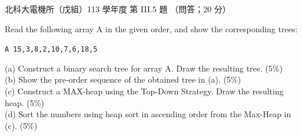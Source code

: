 \begin{pastexam}[label={px:ntut-113-ee-ds-14}]{北科大電機所（戊組）113 學年度 第 III.5 題}
（問答；20 分）

Read the following array A in the given order, and show the corresponding trees:
\begin{center}\texttt{A 15,3,8,2,10,7,6,18,5}\end{center}
(a) Construct a binary search tree for array A. Draw the resulting tree. (5\%)\\
(b) Show the pre-order sequence of the obtained tree in (a). (5\%)\\
(c) Construct a MAX-heap using the Top-Down Strategy. Draw the resulting heap. (5\%)\\
(d) Sort the numbers using heap sort in ascending order from the Max-Heap in (c). (5\%)
\end{pastexam}

